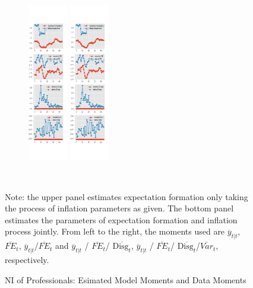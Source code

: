 \documentclass[]{article}
\begin{document}
\begin{figure}[ht]
\begin{subfigure}[b]{\textwidth}
		\includegraphics[width=0.19\textwidth]{figures/spf_ni_est_joint_diag3.png}
		\includegraphics[width=0.19\textwidth]{figures/spf_ni_est_joint_diag4.png}
	\end{subfigure}
	\\
	\begin{flushleft}
		{\footnotesize Note: the upper panel estimates expectation formation only taking the process of inflation parameters as given. The bottom panel estimates the parameters of expectation formation and inflation process jointly. From left to the right, the moments used are $\overline y_{t|t}$, $\overline{FE}_{t}$, $\overline y_{t|t}$/$\overline{FE}_{t}$ and $\overline y_{t|t}$ / $\overline{FE}_{t}$/ $\overline{\textrm{Disg}_t}$, $\overline y_{t|t}$ / $\overline{FE}_{t}$/ $\overline{\textrm{Disg}_t}$/$\overline{Var}_t$,  respectively. }
	\end{flushleft}
	\caption{NI of Professionals: Esimated Model Moments and Data Moments}
\end{figure}
\end{document}
